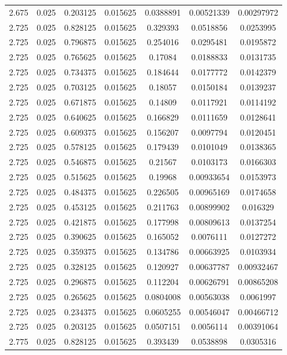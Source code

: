 \begin{flushleft}
\begin{longtable}{ccccccc}
2.675 & 0.025 & 0.203125 & 0.015625 & 0.0388891 & 0.00521339 & 0.00297972  \\ 
2.725 & 0.025 & 0.828125 & 0.015625 & 0.329393 & 0.0518856 & 0.0253995  \\ 
2.725 & 0.025 & 0.796875 & 0.015625 & 0.254016 & 0.0295481 & 0.0195872  \\ 
2.725 & 0.025 & 0.765625 & 0.015625 & 0.17084 & 0.0188833 & 0.0131735  \\ 
2.725 & 0.025 & 0.734375 & 0.015625 & 0.184644 & 0.0177772 & 0.0142379  \\ 
2.725 & 0.025 & 0.703125 & 0.015625 & 0.18057 & 0.0150184 & 0.0139237  \\ 
2.725 & 0.025 & 0.671875 & 0.015625 & 0.14809 & 0.0117921 & 0.0114192  \\ 
2.725 & 0.025 & 0.640625 & 0.015625 & 0.166829 & 0.0111659 & 0.0128641  \\ 
2.725 & 0.025 & 0.609375 & 0.015625 & 0.156207 & 0.0097794 & 0.0120451  \\ 
2.725 & 0.025 & 0.578125 & 0.015625 & 0.179439 & 0.0101049 & 0.0138365  \\ 
2.725 & 0.025 & 0.546875 & 0.015625 & 0.21567 & 0.0103173 & 0.0166303  \\ 
2.725 & 0.025 & 0.515625 & 0.015625 & 0.19968 & 0.00933654 & 0.0153973  \\ 
2.725 & 0.025 & 0.484375 & 0.015625 & 0.226505 & 0.00965169 & 0.0174658  \\ 
2.725 & 0.025 & 0.453125 & 0.015625 & 0.211763 & 0.00899902 & 0.016329  \\ 
2.725 & 0.025 & 0.421875 & 0.015625 & 0.177998 & 0.00809613 & 0.0137254  \\ 
2.725 & 0.025 & 0.390625 & 0.015625 & 0.165052 & 0.0076111 & 0.0127272  \\ 
2.725 & 0.025 & 0.359375 & 0.015625 & 0.134786 & 0.00663925 & 0.0103934  \\ 
2.725 & 0.025 & 0.328125 & 0.015625 & 0.120927 & 0.00637787 & 0.00932467  \\ 
2.725 & 0.025 & 0.296875 & 0.015625 & 0.112204 & 0.00626791 & 0.00865208  \\ 
2.725 & 0.025 & 0.265625 & 0.015625 & 0.0804008 & 0.00563038 & 0.0061997  \\ 
2.725 & 0.025 & 0.234375 & 0.015625 & 0.0605255 & 0.00546047 & 0.00466712  \\ 
2.725 & 0.025 & 0.203125 & 0.015625 & 0.0507151 & 0.0056114 & 0.00391064  \\ 
2.775 & 0.025 & 0.828125 & 0.015625 & 0.393439 & 0.0538898 & 0.0305316  \\ 

\end{longtable}
\end{flushleft}
